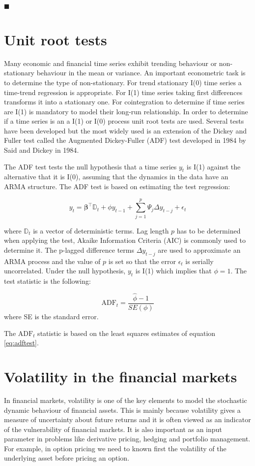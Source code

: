 $\blacksquare$

\section{Unit root tests}
Many economic and financial time series exhibit trending behaviour or non-stationary behaviour in the mean or variance. An important econometric task is to determine the type of non-stationary. For trend stationary I(0) time series a time-trend regression is appropriate. For I(1) time series taking first differences transforms it into a stationary one.  For cointegration to determine if time series are I(1) is mandatory to model their long-run relationship. In order to determine if a time series is an a I(1) or I(0) process unit root tests are used. Several tests have been developed but the most widely used is an extension of the Dickey and Fuller test \cite{dickey1979} called the Augmented Dickey-Fuller (ADF) test developed in 1984 by Said and Dickey in 1984\cite{said1984}.

The ADF test tests the null hypothesis that a time series $y_t$ is I(1) against the alternative that it is I(0), assuming that the dynamics in the data have an ARMA structure. The ADF test is based on estimating the test regression:

\begin{equation}
\label{eq:adftest}
y_t = \boldsymbol{\beta}^\top \mathbb{D}_t + \phi y_{t-1} + \sum_{j=1}^p \Psi_j \Delta y_{t-j} + \epsilon_t
\end{equation}

\noindent where $\mathbb{D}_t$ is a vector of deterministic terms. Lag length $p$ has to be determined when applying the test, Akaike Information Criteria (AIC) is commonly used to determine it.
The p-lagged difference terms $\Delta y_{t-j}$ are used to approximate an ARMA process and the value of $p$ is set so that the error $\epsilon_t$ is serially uncorrelated. 
Under the null hypothesis, $y_t$ is I(1) which implies that $\phi=1$. 
The test statistic is the following:

\[
\text{ADF}_t = \frac{\hat{\phi} -1}{SE(\phi)}
\]
\noindent where SE is the standard error.

The $\text{ADF}_t$ statistic is based on the least squares estimates of equation \ref{eq:adftest}.




\section{Volatility in the financial markets}
In financial markets, volatility is one of the key elements to model the
stochastic dynamic behaviour of financial assets. This is mainly because
volatility gives a measure of uncertainty about future returns and it is often
viewed as an indicator of the vulnerability of financial markets. It is also
important as an input parameter in problems like derivative pricing, hedging
and portfolio management.  For example, in option pricing we need to known
first the volatility of the underlying asset before pricing an option. 

